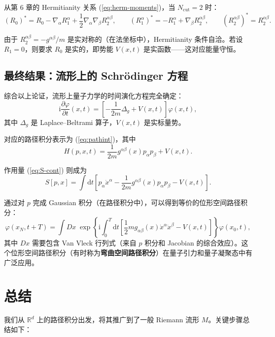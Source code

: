 \documentclass{book}
\newcommand{\mathd}{\mathrm{d}}
\newcommand{\mathi}{\mathrm{i}}
\begin{document}
从第 6 章的 Hermitianity 关系 (\ref{eq:herm-moments})，当 $N_\text{cut}=2$ 时：
\[
(R_0)^* = R_0 - \nabla_\alpha R_1^\alpha + \frac12 \nabla_\alpha \nabla_\beta R_2^{\alpha\beta},
\qquad
(R_1^\alpha)^* = -R_1^\alpha + \nabla_\beta R_2^{\alpha\beta},
\qquad
(R_2^{\alpha\beta})^* = R_2^{\alpha\beta}.
\]

由于 $R_2^{\alpha\beta} = -g^{\alpha\beta}/m$ 是实对称的（在法坐标中），Hermitianity 条件自洽。若设 $R_1 = 0$，则要求 $R_0$ 是实的，即势能 $V(x,t)$ 是实函数——这对应能量守恒。

\section{最终结果：流形上的 Schrödinger 方程}

综合以上论证，流形上量子力学的时间演化方程完全确定：
\[
\boxed{\mathi \frac{\partial\varphi}{\partial t}(x,t) = \left[ -\frac{1}{2m} \Delta_g + V(x,t) \right] \varphi(x,t)},
\]
其中 $\Delta_g$ 是 Laplace--Beltrami 算子，$V(x,t)$ 是实标量势。

对应的路径积分表示为 (\ref{eq:pathint})，其中
\[
H(p,x,t) = \frac{1}{2m} g^{\alpha\beta}(x) p_\alpha p_\beta + V(x,t).
\]

作用量 (\ref{eq:S-cont}) 则成为
\[
S[p,x] = \int \mathd t \left[ p_\alpha \dot{x}^\alpha - \frac{1}{2m} g^{\alpha\beta}(x) p_\alpha p_\beta - V(x,t) \right].
\]

通过对 $p$ 完成 Gaussian 积分（在路径积分中），可以得到等价的位形空间路径积分：
\[
\varphi(x_N, t+T) = \int Dx \; \exp\left\{ \mathi \int_0^T \mathd t \left[ \frac{1}{2} m g_{\alpha\beta}(x) \dot{x}^\alpha \dot{x}^\beta - V(x,t) \right] \right\} \varphi(x_0, t),
\]
其中 $Dx$ 需要包含 Van Vleck 行列式（来自 $p$ 积分和 Jacobian 的综合效应）。这个位形空间路径积分（有时称为\textbf{弯曲空间路径积分}）在量子引力和量子凝聚态中有广泛应用。

\chapter{总结}

我们从 $\mathbb{R}^d$ 上的路径积分出发，将其推广到了一般 Riemann 流形 $M$。关键步骤总结如下：
\end{document}
